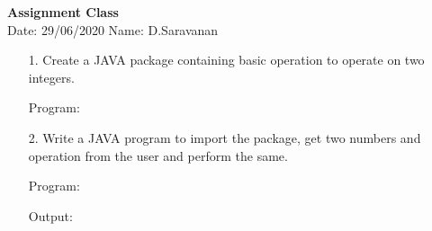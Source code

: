 \documentclass[a4paper,11pt,openright]{report}
\begin{document}
\singlespacing
\pagestyle{plain}

\begin{center}
\textbf{Assignment Class} \\
Date: 29/06/2020 \hspace{2mm} Name: D.Saravanan
\end{center}

\vspace{10px}

\begin{enumerate}

\item[1.] Create a JAVA package containing basic operation to operate on two integers.

\vspace{0.5cm}

Program:


\pagebreak

\item[2.] Write a JAVA program to import the package, get two numbers and operation from the
user and perform the same.

\vspace{0.5cm}

Program:


\pagebreak

Output:


\end{enumerate}
\end{document}
